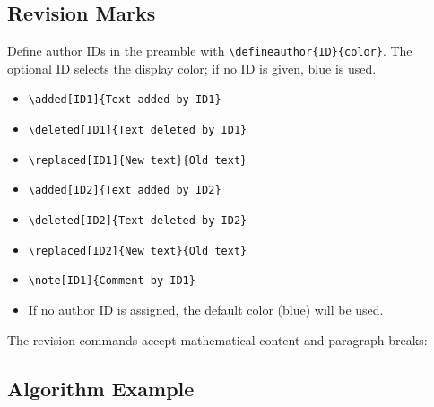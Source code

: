 \documentclass[letterpaper,12pt]{article}
\begin{document}
\subsection{Revision Marks}

Define author IDs in the preamble with \verb|\defineauthor{ID}{color}|. The optional ID selects the display color; if no ID is given, blue is used.
\begin{itemize}
    \item \verb|\added[ID1]{Text added by ID1}| 
    \item \verb|\deleted[ID1]{Text deleted by ID1}| 
    \item \verb|\replaced[ID1]{New text}{Old text}| 
    \item \verb|\added[ID2]{Text added by ID2}| 
    \item \verb|\deleted[ID2]{Text deleted by ID2}| 
    \item \verb|\replaced[ID2]{New text}{Old text}| 
    \item \verb|\note[ID1]{Comment by ID1}| 
    \item If no author ID is assigned, the default color (blue) will be used. 
\end{itemize}

The revision commands accept mathematical content and paragraph breaks:



\subsection{Algorithm Example}
\end{document}
